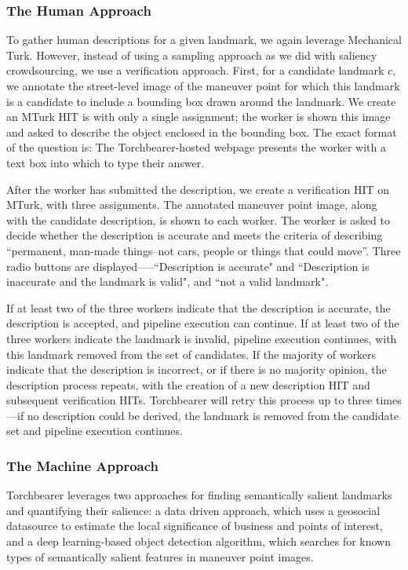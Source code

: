 \subsubsection{The Human Approach}
To gather human descriptions for a given landmark, we again leverage Mechanical Turk. However, instead of using a sampling approach as we did with saliency crowdsourcing, we use a verification approach.
First, for a candidate landmark $c$, we annotate the street-level image of the maneuver point for which this landmark is a candidate to include a bounding box drawn around the landmark. We create an MTurk HIT is with only a single assignment; the worker is shown this image and asked to describe the object enclosed in the bounding box. The exact format of the question is:  The Torchbearer-hosted webpage presents the worker with a text box into which to type their answer.

After the worker has submitted the description, we create a verification HIT on MTurk, with three assignments. The annotated maneuver point image, along with the candidate description, is shown to each worker. The worker is asked to decide whether the description is accurate and meets the criteria of describing “permanent, man-made things--not cars, people or things that could move”. Three radio buttons are displayed—--``Description is accurate" and ``Description is inaccurate and the landmark is valid", and ``not a valid landmark".

If at least two of the three workers indicate that the description is accurate, the description is accepted, and pipeline execution can continue. If at least two of the three workers indicate the landmark is invalid, pipeline execution continues, with this landmark removed from the set of candidates. If the majority of workers indicate that the description is incorrect, or if there is no majority opinion, the description process repeats, with the creation of a new description HIT and subsequent verification HITs. Torchbearer will retry this process up to three times---if no description could be derived, the landmark is removed from the candidate set and pipeline execution continues.

\subsubsection{The Machine Approach}
Torchbearer leverages two approaches for finding semantically salient landmarks and quantifying their salience: a data driven approach, which uses a geosocial datasource to estimate the local significance of business and points of interest, and a deep learning-based object detection algorithm, which searches for known types of semantically salient features in maneuver point images.
	
